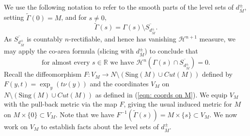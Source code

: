 \documentclass[11pt]{article}
\begin{document}
We use the following notation to refer to the smooth parts of the level sets of $d^\pm_{\overline{M}}$, setting $\widetilde{\Gamma}(0) = M$, and for $s \neq 0$,
\begin{equation*}
    \widetilde{\Gamma}(s) = \Gamma(s) \setminus \overline{S_{d^\pm_{\overline{M}}}}.
\end{equation*}
As $\overline{S_{d^\pm_{\overline{M}}}}$ is countably $n$-rectifiable, and hence has vanishing $\mathcal{H}^{n+1}$ measure, we may apply the co-area formula (slicing with $d^\pm_{\overline{M}}$) to conclude that 
\begin{equation}\label{eqn: smooth parts of level sets a.e.}
 \text{for almost every } s \in \mathbb{R} \text{ we have } \mathcal{H}^n\left(\Gamma(s) \cap \overline{S_{d^\pm_{\overline{M}}}}\right) = 0.
\end{equation}
Recall the diffeomorphism $F : V_{M} \rightarrow N \setminus (\mathrm{Sing}(M) \cup Cut(M))$ defined by $F(y,t) = \exp_y(t\nu(y))$ and the coordinates $V_{M}$ on $N \setminus (\mathrm{Sing}(M) \cup Cut(M))$ as defined in (\ref{eqn: coords on M}). We equip $V_{M}$ with the pull-back metric via the map $F$, giving the usual induced metric for $M$ on $M \times \{0\} \subset V_{M}$. Note that we have $F^{-1}(\widetilde{\Gamma}(s)) = M \times \{s\} \subset V_{M}$. We now work on $V_{M}$ to establish facts about the level sets of $d^\pm_{\overline{M}}$.

\bigskip
\end{document}
